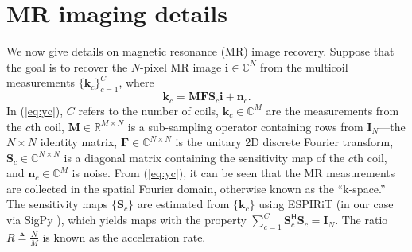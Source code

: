\documentclass{article}
\theoremstyle{plain}
\theoremstyle{definition}
\theoremstyle{remark}
\renewcommand{\vec}[1]{\ensuremath{\boldsymbol{#1}}}
\newcommand{\Real}{{\mathbb{R}}}
\newcommand{\Complex}{{\mathbb{C}}}
\newcommand{\herm}{^{\textsf{H}}}
\renewcommand{\eqref}[1]{(\ref{eq:#1})}
\begin{document}

\section{MR imaging details} \label{app:MRI}
We now give details on magnetic resonance (MR) image recovery.
Suppose that the goal is to recover the $N$-pixel MR image $\vec{i}\in\Complex^N$ from the multicoil measurements $\{\vec{k}_c\}_{c=1}^C$, where \cite{Prussmann:MRM:99}
\begin{equation} 
\vec{k}_c = \vec{MFS}_c\vec{i} + \vec{n}_c
\label{eq:yc}.
\end{equation}
In \eqref{yc}, $C$ refers to the number of coils, $\vec{k}_c\in\Complex^M$ are the measurements from the $c$th coil, $\vec{M} \in \Real^{M\times N}$ is a sub-sampling operator containing rows from $\vec{I}_N$---the $N\times N$ identity matrix, $\vec{F} \in \Complex^{N\times N}$ is the unitary 2D discrete Fourier transform, $\vec{S}_c \in \Complex^{N\times N}$ is a diagonal matrix containing the sensitivity map of the $c$th coil,  and $\vec{n}_c \in \Complex^{M}$ is noise.
From \eqref{yc}, it can be seen that the MR measurements are collected in the spatial Fourier domain, otherwise known as the ``k-space.''
The sensitivity maps $\{\vec{S}_c\}$ are estimated from $\{\vec{k}_c\}$ using ESPIRiT \cite{Uecker:MRM:14} (in our case via SigPy \cite{Ong:SigPy:19}), which yields maps with the property $\sum_{c=1}^C\vec{S}_c\herm\vec{S}_c=\vec{I}_N$.
The ratio $R\triangleq \frac{N}{M}$ is known as the acceleration rate.
\end{document}
